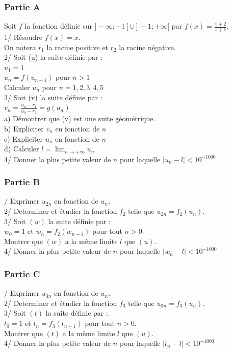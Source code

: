 \documentclass[a4paper,11pt]{book}
\begin{document}
\subsubsection{Partie A}
Soit $f$ la fonction d\'efinie sur $]-\infty;-1[\cup]-1;+\infty[$ par 
$f(x)=\frac{x+2}{x+1}$.\\
1/ R\'esoudre $f(x)=x$.\\
On notera $r_1$ la racine positive et $r_2$ la racine n\'egative.\\
2/ Soit (u) la suite d\'efinie par :\\
$u_1=1$\\
$u_n=f(u_{n-1})$ pour $n>1$\\
Calculer $u_n$ pour $n=1,2,3,4,5$\\
3/ Soit (v) la suite d\'efinie par :\\
$v_n=\frac{u_n-r_1}{u_n-r_2}=g(u_n)$\\
a) D\'emontrer que (v) est une suite g\'eom\'etrique.\\
b) Expliciter $v_n$ en fonction de $n$\\ 
c) Expliciter $u_n$ en fonction de $n$\\ 
d) Calculer $l=\lim_{n \rightarrow +\infty} u_n$\\
4/ Donner la plus petite valeur de $n$ pour laquelle $|u_n-l|<10^{-1000}$
\subsubsection{Partie B}
/ Exprimer $u_{2n}$ en fonction de $u_n$.\\
2/ Determiner et \'etudier la fonction $f_2$ telle que $u_{2n}=f_2(u_n)$.\\
3/ Soit $(w)$ la suite d\'efinie par :\\
$w_0=1$ et $w_n=f_2(w_{n-1})$ pour tout $n>0$.\\
Montrer que $(w)$ a la m\^eme limite $l$ que  $(u)$.\\
4/ Donner la plus petite valeur de $n$ pour laquelle $|w_n-l|<10^{-1000}$
\subsubsection{Partie C}
/ Exprimer $u_{3n}$ en fonction de $u_n$.\\
2/ Determiner et \'etudier la fonction $f_3$ telle que $u_{3n}=f_3(u_n)$.\\
3/ Soit $(t)$ la suite d\'efinie par :\\
$t_0=1$ et $t_n=f_3(t_{n-1})$ pour tout $n>0$.\\
Montrer que $(t)$ a la m\^eme limite $l$ que  $(u)$.\\
4/ Donner la plus petite valeur de $n$ pour laquelle $|t_n-l|<10^{-1000}$
\end{document}

